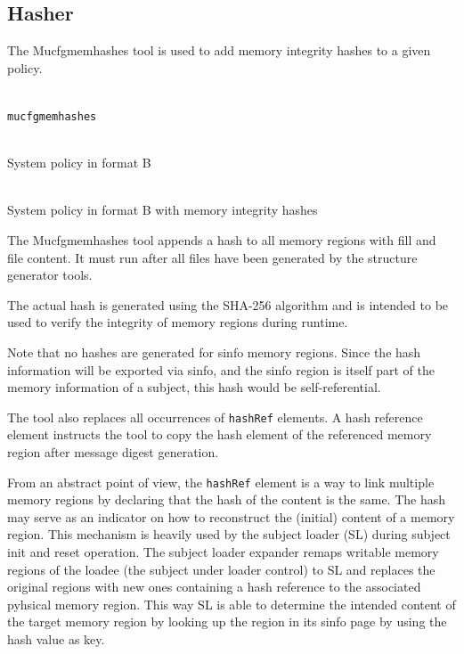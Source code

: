 \documentclass[a4paper,twoside,titlepage]{article}
\begin{document}
\subsection{Hasher}
The Mucfgmemhashes tool is used to add memory integrity hashes to a given
policy.

\begin{description} \itemsep1pt \parskip0pt
	\item[Name] \hfill \\
		\texttt{mucfgmemhashes}
	\item[Input] \hfill \\
		System policy in format B
	\item[Output] \hfill \\
		System policy in format B with memory integrity hashes
\end{description}

The Mucfgmemhashes tool appends a hash to all memory regions with fill and file
content. It must run after all files have been generated by the structure
generator tools.

The actual hash is generated using the SHA-256 algorithm and is intended to be
used to verify the integrity of memory regions during runtime.

Note that no hashes are generated for sinfo memory regions. Since the
hash information will be exported via sinfo, and the sinfo region is
itself part of the memory information of a subject, this hash would be
self-referential.

The tool also replaces all occurrences of \texttt{hashRef} elements. A hash
reference element instructs the tool to copy the hash element of the referenced
memory region after message digest generation.

From an abstract point of view, the \texttt{hashRef} element is a way to link
multiple memory regions by declaring that the hash of the content is the same.
The hash may serve as an indicator on how to reconstruct the (initial) content
of a memory region. This mechanism is heavily used by the subject loader (SL)
during subject init and reset operation. The subject loader expander remaps
writable memory regions of the loadee (the subject under loader control) to SL
and replaces the original regions with new ones containing a hash reference to
the associated pyhsical memory region. This way SL is able to determine the
intended content of the target memory region by looking up the region in its
sinfo page by using the hash value as key.
\end{document}
